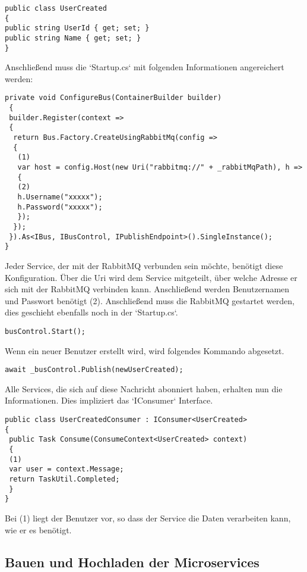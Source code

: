 \begin{verbatim}
public class UserCreated
{
public string UserId { get; set; }
public string Name { get; set; }
}
\end{verbatim}

Anschließend muss die `Startup.cs` mit folgenden Informationen angereichert werden: 

\begin{verbatim}
private void ConfigureBus(ContainerBuilder builder)
 {
 builder.Register(context =>
 {
  return Bus.Factory.CreateUsingRabbitMq(config =>
  { 
   (1)
   var host = config.Host(new Uri("rabbitmq://" + _rabbitMqPath), h =>
   {
   (2)
   h.Username("xxxxx");  
   h.Password("xxxxx");
   });
  });
 }).As<IBus, IBusControl, IPublishEndpoint>().SingleInstance();
}
\end{verbatim}

Jeder Service, der mit der RabbitMQ verbunden sein möchte, benötigt diese Konfiguration. Über die Uri wird dem Service mitgeteilt, über welche Adresse er sich mit der RabbitMQ verbinden kann. Anschließend werden Benutzernamen und Passwort benötigt (2). Anschließend muss die RabbitMQ gestartet werden, dies geschieht ebenfalls noch in der `Startup.cs`.

\begin{verbatim}
busControl.Start();
\end{verbatim}

Wenn ein neuer Benutzer erstellt wird, wird folgendes Kommando abgesetzt.

\begin{verbatim}
await _busControl.Publish(newUserCreated);
\end{verbatim}

Alle Services, die sich auf diese Nachricht abonniert haben, erhalten nun die Informationen. Dies impliziert das `IConsumer` Interface.  

\begin{verbatim}
public class UserCreatedConsumer : IConsumer<UserCreated>
{
 public Task Consume(ConsumeContext<UserCreated> context)
 {
 (1)
 var user = context.Message;
 return TaskUtil.Completed;
 }
}
\end{verbatim}

Bei (1) liegt der Benutzer vor, so dass der Service die Daten verarbeiten kann, wie er es benötigt. 

\subsection{Bauen und Hochladen der Microservices}

